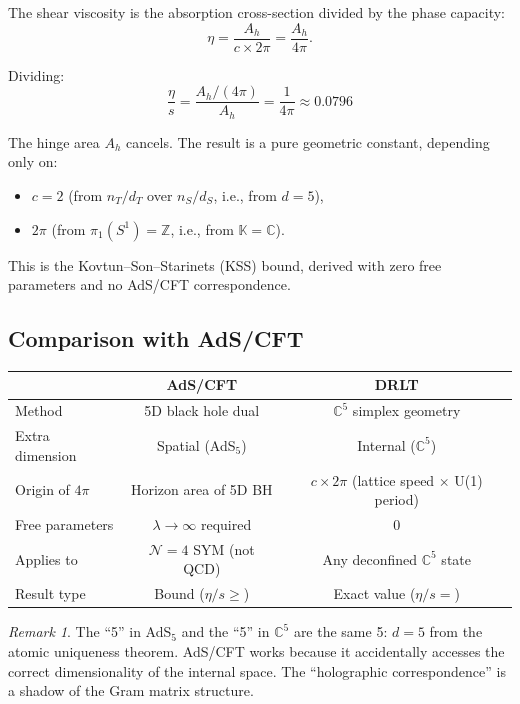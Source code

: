 \documentclass[12pt]{article}
\theoremstyle{definition}
\theoremstyle{remark}
\newtheorem{remark}[theorem]{Remark}
\begin{document}
The shear viscosity is the absorption cross-section divided by the phase capacity:
\begin{equation}
\eta = \frac{A_h}{c \times 2\pi} = \frac{A_h}{4\pi}.
\end{equation}

Dividing:
\begin{equation}
\boxed{\frac{\eta}{s} = \frac{A_h/(4\pi)}{A_h} = \frac{1}{4\pi} \approx 0.0796}
\end{equation}

The hinge area $A_h$ cancels. The result is a pure geometric constant, depending only on:
\begin{itemize}
\item $c = 2$ (from $n_T/d_T$ over $n_S/d_S$, i.e., from $d = 5$),
\item $2\pi$ (from $\pi_1(S^1) = \mathbb{Z}$, i.e., from $\mathbb{K} = \mathbb{C}$).
\end{itemize}

This is the Kovtun--Son--Starinets (KSS) bound, derived with zero free parameters and no AdS/CFT correspondence.

\subsection{Comparison with AdS/CFT}

\begin{center}
\begin{tabular}{lcc}
\hline
& AdS/CFT & DRLT \\
\hline
Method & 5D black hole dual & $\mathbb{C}^5$ simplex geometry \\
Extra dimension & Spatial (AdS$_5$) & Internal ($\mathbb{C}^5$) \\
Origin of $4\pi$ & Horizon area of 5D BH & $c \times 2\pi$ (lattice speed $\times$ U(1) period) \\
Free parameters & $\lambda \to \infty$ required & 0 \\
Applies to & $\mathcal{N} = 4$ SYM (not QCD) & Any deconfined $\mathbb{C}^5$ state \\
Result type & Bound ($\eta/s \geq$) & Exact value ($\eta/s =$) \\
\hline
\end{tabular}
\end{center}

\begin{remark}
The ``5'' in AdS$_5$ and the ``5'' in $\mathbb{C}^5$ are the same 5: $d = 5$ from the atomic uniqueness theorem. AdS/CFT works because it accidentally accesses the correct dimensionality of the internal space. The ``holographic correspondence'' is a shadow of the Gram matrix structure.
\end{remark}
\end{document}
